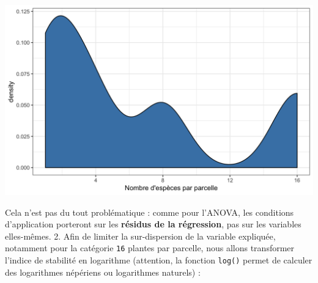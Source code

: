 \documentclass[a4paperpaper,]{article}
\newenvironment{Shaded}{\begin{snugshade}}{\end{snugshade}}
\newcommand{\DataTypeTok}[1]{\textcolor[rgb]{0.00,0.34,0.68}{#1}}
\newcommand{\KeywordTok}[1]{\textcolor[rgb]{0.12,0.11,0.11}{\textbf{#1}}}
\newcommand{\NormalTok}[1]{\textcolor[rgb]{0.12,0.11,0.11}{#1}}
\newcommand{\OperatorTok}[1]{\textcolor[rgb]{0.12,0.11,0.11}{#1}}
\newcommand{\StringTok}[1]{\textcolor[rgb]{0.75,0.01,0.01}{#1}}
\begin{document}
\begin{Shaded}
\end{Shaded}

\begin{center}\includegraphics[width=0.9\linewidth]{figure/unnamed-chunk-114-1} \end{center}

Cela n'est pas du tout problématique : comme pour l'ANOVA, les conditions d'application porteront sur les \textbf{résidus de la régression}, pas sur les variables elles-mêmes.
2. Afin de limiter la sur-dispersion de la variable expliquée, notamment pour la catégorie \texttt{16} plantes par parcelle, nous allons transformer l'indice de stabilité en logarithme (attention, la fonction \texttt{log()} permet de calculer des logarithmes népériens ou logarithmes naturels) :

\begin{Shaded}
\end{Shaded}
\end{document}
